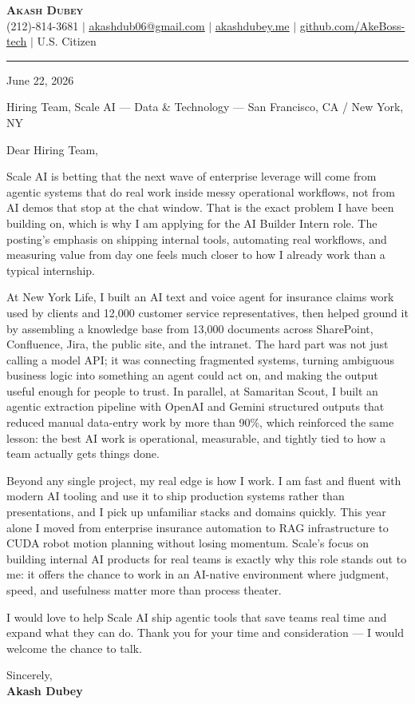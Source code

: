 \documentclass[letterpaper,11pt]{article}
\begin{document}
\begin{center}
    \textbf{\Huge \scshape Akash Dubey} \\ \vspace{2pt}
    \small (212)-814-3681 $|$ \href{mailto:akashdub06@gmail.com}{\underline{akashdub06@gmail.com}} $|$
    \href{https://akashdubey.me/}{\underline{akashdubey.me}} $|$
    \href{https://github.com/AkeBoss-tech}{\underline{github.com/AkeBoss-tech}} $|$
    \small U.S. Citizen
\end{center}
\vspace{4pt}
\hrule
\vspace{10pt}

June 22, 2026

\vspace{2pt}
Hiring Team, Scale AI --- Data \& Technology --- San Francisco, CA / New York, NY

\vspace{6pt}
Dear Hiring Team,

Scale AI is betting that the next wave of enterprise leverage will come from
agentic systems that do real work inside messy operational workflows, not from
AI demos that stop at the chat window. That is the exact problem I have been
building on, which is why I am applying for the AI Builder Intern role. The
posting's emphasis on shipping internal tools, automating real workflows, and
measuring value from day one feels much closer to how I already work than a
typical internship.

At New York Life, I built an AI text and voice agent for insurance claims work
used by clients and 12,000 customer service representatives, then helped ground
it by assembling a knowledge base from 13,000 documents across SharePoint,
Confluence, Jira, the public site, and the intranet. The hard part was not just
calling a model API; it was connecting fragmented systems, turning ambiguous
business logic into something an agent could act on, and making the output
useful enough for people to trust. In parallel, at Samaritan Scout, I built an
agentic extraction pipeline with OpenAI and Gemini structured outputs that
reduced manual data-entry work by more than 90\%, which reinforced the same
lesson: the best AI work is operational, measurable, and tightly tied to how a
team actually gets things done.

Beyond any single project, my real edge is how I work. I am fast and fluent
with modern AI tooling and use it to ship production systems rather than
presentations, and I pick up unfamiliar stacks and domains quickly. This year
alone I moved from enterprise insurance automation to RAG infrastructure to
CUDA robot motion planning without losing momentum. Scale's focus on building
internal AI products for real teams is exactly why this role stands out to me:
it offers the chance to work in an AI-native environment where judgment, speed,
and usefulness matter more than process theater.

I would love to help Scale AI ship agentic tools that save teams real time and
expand what they can do. Thank you for your time and consideration --- I would
welcome the chance to talk.

\vspace{6pt}
Sincerely, \\
\textbf{Akash Dubey}
\end{document}
